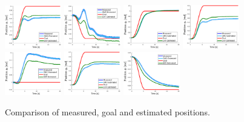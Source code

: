 \documentclass[conference,letterpaper]{ieeeconf}
\begin{document}
\begin{figure}
  \centering
  \includegraphics[width=0.22\textwidth]{Figures/result_q1.eps}
  \includegraphics[width=0.22\textwidth]{Figures/result_q2.eps}
  \includegraphics[width=0.22\textwidth]{Figures/result_q3.eps}
  \includegraphics[width=0.22\textwidth]{Figures/result_q4.eps}
  \includegraphics[width=0.22\textwidth]{Figures/result_q5.eps}
  \includegraphics[width=0.22\textwidth]{Figures/result_q6.eps}
  \includegraphics[width=0.22\textwidth]{Figures/result_q7.eps}
  \caption{Comparison of measured, goal and estimated positions.}
  \label{fig:result_q}
\end{figure}
\end{document}
